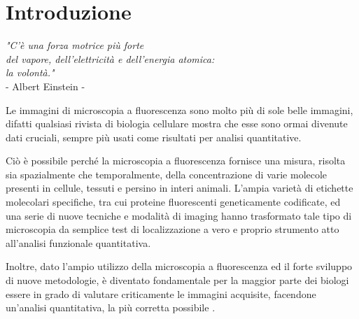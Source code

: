 \clearpage{\pagestyle{empty}\cleardoublepage}
\chapter*{Introduzione} 
\begin{flushright}\begin{small}\textit{"C'è una forza motrice più forte\\ del vapore, dell'elettricità e dell'energia atomica:\\ la volontà."}\\
- Albert Einstein -\\
\end{small}\end{flushright}

Le immagini di microscopia a fluorescenza sono molto più di sole belle immagini, difatti qualsiasi rivista di biologia cellulare mostra che esse sono ormai divenute dati cruciali, sempre più usati come risultati per analisi quantitative.

Ciò è possibile perché la microscopia a fluorescenza fornisce una misura, risolta sia spazialmente che temporalmente, della concentrazione di varie molecole presenti in cellule, tessuti e persino in interi animali. 
L'ampia varietà di etichette molecolari specifiche, tra cui proteine fluorescenti geneticamente codificate, ed una serie di nuove tecniche e modalità di imaging  hanno trasformato tale tipo di microscopia da semplice test di localizzazione a vero e proprio strumento atto all'analisi funzionale quantitativa. 

Inoltre, dato l'ampio utilizzo della microscopia a fluorescenza ed il forte sviluppo di nuove metodologie, è diventato fondamentale per la maggior parte dei biologi essere in grado di valutare criticamente le immagini acquisite, facendone un'analisi quantitativa, la più corretta possibile \cite{fluo}.